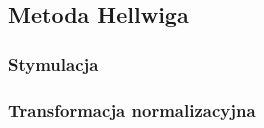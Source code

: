 \documentclass[12pt,a4paper]{report}
\begin{document}
{\subsection{Metoda Hellwiga}
\subsubsection{Stymulacja} 
\begin{Shaded}
\begin{Highlighting}[]
\NormalTok{)} 
\end{Highlighting}
\end{Shaded}
\subsubsection{Transformacja normalizacyjna}
\begin{Shaded}
\begin{Highlighting}[]
\end{Highlighting}
\end{Shaded}
}
\end{document}
